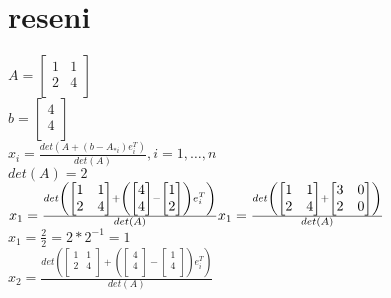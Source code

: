 \documentclass[a4paper]{article}
\begin{document}
\section*{reseni}
$
A = \left[ \begin{matrix} 
	1 & 1 \\
	2 & 4 \\
\end{matrix} \right]
$\\
$
b = \left[ \begin{matrix} 
	4 \\
	4 \\
\end{matrix} \right]
$\\
$
x_i = \frac{
	det(A+(b-A_{*i})e^T_i)
}{
	det(A)
}, i = 1 , \dots , n
$\\
$det(A) = 2$\\
$
x_1 = \frac{det\left(
	\left[ \begin{matrix} 
		1 & 1 \\
		2 & 4 \\
	\end{matrix} \right] + \left(
		\left[ \begin{matrix} 
			4 \\
			4 \\
		\end{matrix} \right] -
		\left[ \begin{matrix} 
			1 \\
			2 \\
		\end{matrix} \right]
	\right)e^T_i
\right)}{
	det(A)
}
\\
x_1 = \frac{det\left(
	\left[ \begin{matrix} 
		1 & 1 \\
		2 & 4 \\
	\end{matrix} \right] + 
	\left[ \begin{matrix} 
		3 & 0 \\
		2 & 0 \\
	\end{matrix} \right]
\right)}{
	det(A)
}
$\\
$
x_1 = \frac{2}{2} = 2*2^{-1} = 1
$\\
$
x_2 = \frac{det\left(
	\left[ \begin{matrix} 
		1 & 1 \\
		2 & 4 \\
	\end{matrix} \right] + \left(
		\left[ \begin{matrix} 
			4 \\
			4 \\
		\end{matrix} \right] -
		\left[ \begin{matrix} 
			1 \\
			4 \\
		\end{matrix} \right]
	\right)e^T_i
\right)}{
	det(A)
}$\\
\end{document}
